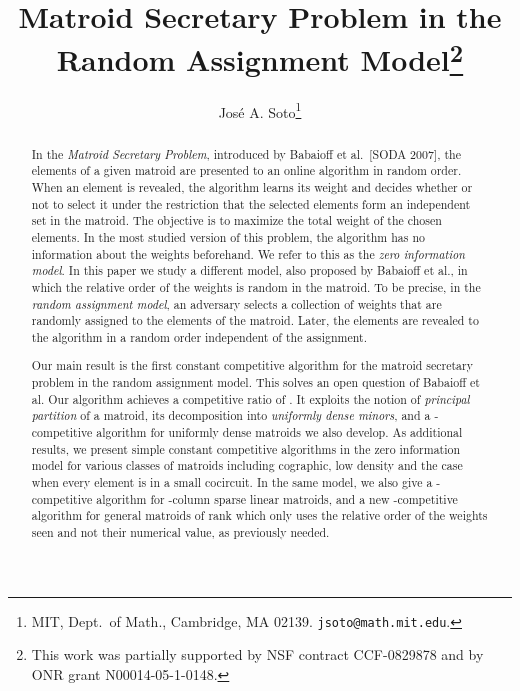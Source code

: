 \documentclass[letterpaper,11pt]{article}
\theoremstyle{definition}
\theoremstyle{remark}
\begin{document}
\title{Matroid Secretary Problem in the Random Assignment Model\footnote{This work was partially supported by NSF
  contract CCF-0829878 and by ONR grant N00014-05-1-0148.}}
\author{Jos\'e A. Soto\thanks{MIT,
Dept.~of Math., Cambridge, MA 02139. \texttt{jsoto@math.mit.edu}.}}
\date{}

\maketitle
\begin{abstract}
In the \emph{Matroid Secretary Problem}, introduced by Babaioff et al.~[SODA 2007], the elements of a given matroid are presented to an online algorithm in random order. When an element is revealed, the algorithm learns its weight and decides whether or not to select it under the restriction that the selected elements form an independent set in the matroid. The objective is to maximize the total weight of the chosen elements. In the most studied version of this problem, the algorithm has no information about the weights beforehand. We refer to this as the \emph{zero information model}. In this paper we study a different model, also proposed by Babaioff et al., in which the relative order of the weights is random in the matroid. To be precise, in the \emph{random assignment model}, an adversary selects a collection of weights that are randomly assigned to the elements of the matroid. Later, the elements are revealed to the algorithm in a random order independent of the assignment.

Our main result is the first constant competitive algorithm for the matroid secretary problem in the random assignment model. This solves an open question of Babaioff et al. Our algorithm achieves a competitive ratio of . It exploits the notion of \emph{principal partition} of a matroid, its decomposition into \emph{uniformly dense minors}, and a -competitive algorithm for uniformly dense matroids we also develop. As additional results, we present simple constant competitive algorithms in the zero information model for various classes of matroids including cographic, low density and the case when every element is in a small cocircuit. In the same model, we also give a -competitive algorithm for -column sparse linear matroids, and a new -competitive algorithm for general matroids of rank  which only uses the relative order of the weights seen and not their numerical value, as previously needed.
\end{abstract}
\thispagestyle{empty}
\end{document}
